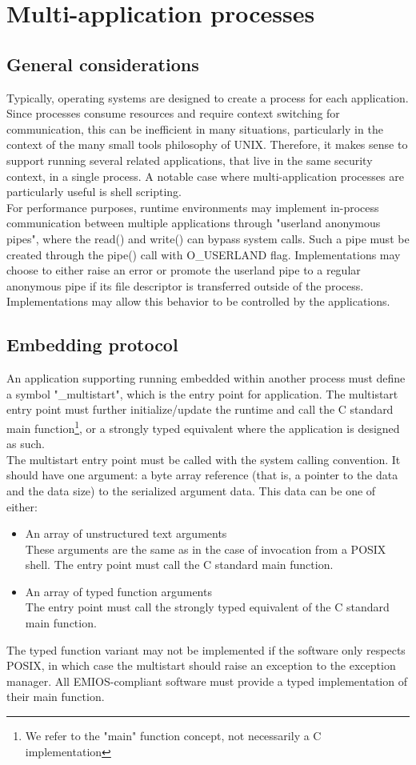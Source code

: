 \section{Multi-application processes}
\subsection{General considerations}
Typically, operating systems are designed to create a process for each application. Since processes consume resources and require context switching for communication, this can be inefficient in many situations, particularly in the context of the many small tools philosophy of UNIX. Therefore, it makes sense to support running several related applications, that live in the same security context, in a single process. A notable case where multi-application processes are particularly useful is shell scripting.\\
For performance purposes, runtime environments may implement in-process communication between multiple applications through "userland anonymous pipes", where the read() and write() can bypass system calls. Such a pipe must be created through the pipe() call with O\_USERLAND flag. Implementations may choose to either raise an error or promote the userland pipe to a regular anonymous pipe if its file descriptor is transferred outside of the process. Implementations may allow this behavior to be controlled by the applications.
\subsection{Embedding protocol}
An application supporting running embedded within another process must define a symbol "\_multistart", which is the entry point for application. The multistart entry point must further initialize/update the runtime and call the C standard main function\footnote{We refer to the "main" function concept, not necessarily a C implementation}, or a strongly typed equivalent where the application is designed as such.\\
The multistart entry point must be called with the system calling convention. It should have one argument: a byte array reference (that is, a pointer to the data and the data size) to the serialized argument data. This data can be one of either:
\begin{itemize}
	\item An array of unstructured text arguments\\
	These arguments are the same as in the case of invocation from a POSIX shell. The entry point must call the C standard main function.
	\item An array of typed function arguments\\
	The entry point must call the strongly typed equivalent of the C standard main function.
\end{itemize}
The typed function variant may not be implemented if the software only respects POSIX, in which case the multistart should raise an exception to the exception manager. All EMIOS-compliant software must provide a typed implementation of their main function.
\clearpage
